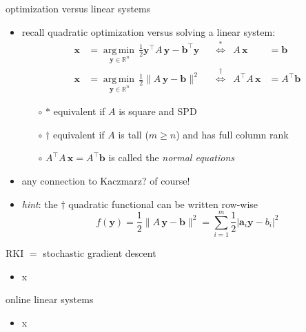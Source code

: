 \documentclass[usepdftitle=false,usenames,dvipsnames]{beamer}
\newcommand{\RR}{\mathbb{R}}
\newcommand{\argmin}[1]{\underset{#1}{\operatorname{arg\, min}\,}}
\newcommand{\ba}{\mathbf{a}}
\newcommand{\bb}{\mathbf{b}}
\newcommand{\bx}{\mathbf{x}}
\newcommand{\by}{\mathbf{y}}
\begin{document}
\begin{frame}{optimization versus linear systems}

\begin{itemize}
\item recall quadratic optimization versus solving a linear system:
\begin{align*}
\bx &= \argmin{\by \in \RR^n} \frac{1}{2} \by^\top A\, \by - \bb^\top \by &&\stackrel{\ast}{\iff} & A\,\bx&=\bb \\
\bx &= \argmin{\by \in \RR^n} \frac{1}{2} \|A\, \by - \bb\|^2 &&\stackrel{\dagger}{\iff} & A^\top A\,\bx&=A^\top\bb
\end{align*}

    \begin{itemize}
    \item[$\circ$] $\ast$ equivalent if $A$ is square and SPD
    \item[$\circ$] $\dagger$ equivalent if $A$ is tall ($m\ge n$) and has full column rank
    \item[$\circ$] $A^\top A\,\bx=A^\top\bb$ is called the \emph{normal equations}
    \end{itemize}
\item any connection to Kaczmarz?  of course!
\item \emph{hint}: the $\dagger$ quadratic functional can be written row-wise
	$$f(\by) = \frac{1}{2} \|A\, \by - \bb\|^2 = \sum_{i=1}^m \frac{1}{2} |\ba_i \by - b_i|^2$$
\end{itemize}
\end{frame}


\begin{frame}{RKI $=$ stochastic gradient descent}

\begin{itemize}
\item x
\end{itemize}
\end{frame}


\begin{frame}{online linear systems}

\begin{itemize}
\item x
\end{itemize}
\end{frame}
\end{document}

